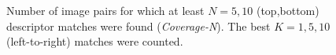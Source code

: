 \documentclass[10pt,journal,cspaper,compsoc]{IEEEtran}
\begin{document}
\begin{figure}[htbp]
\begin{center}
\caption{Number of image pairs for which at least $N=5,10$ (top,bottom)
descriptor matches were found ({\em Coverage-N}). The best
$K=1,5,10$ (left-to-right) matches were counted.
\label{fig:coverage}}
\end{center}
\end{figure}

%
\end{document}
